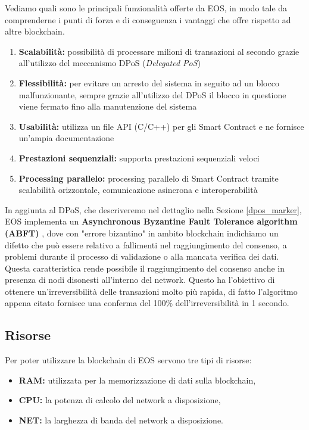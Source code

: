 Vediamo quali sono le principali funzionalità offerte da EOS, in modo tale da comprenderne i punti di forza e di conseguenza i vantaggi che offre rispetto ad altre blockchain.
\begin{enumerate}
    \item \textbf{Scalabilità:} possibilità di processare milioni di transazioni al secondo grazie all'utilizzo del meccanismo DPoS (\textit{Delegated PoS}) \cite{vitale2018DPOS,ZHANG202093}
    \item \textbf{Flessibilità:} per evitare un arresto del sistema in seguito ad un blocco malfunzionante, sempre grazie all'utilizzo del DPoS il blocco in questione viene fermato fino alla manutenzione del sistema
    \item \textbf{Usabilità:} utilizza un file API (C/C++) per gli Smart Contract e ne fornisce un'ampia documentazione
    \item \textbf{Prestazioni sequenziali:} supporta prestazioni sequenziali veloci
    \item \textbf{Processing parallelo:}  processing parallelo di Smart Contract tramite scalabilità orizzontale, comunicazione asincrona e interoperabilità
\end{enumerate}

In aggiunta al DPoS, che descriveremo nel dettaglio nella Sezione \ref{dpos_marker}, EOS implementa un \textbf{Asynchronous Byzantine Fault Tolerance algorithm (ABFT)} \cite{castro1999practical}, dove con "errore bizantino" in ambito blockchain indichiamo un difetto che può essere relativo a fallimenti nel raggiungimento del consenso, a problemi durante il processo di validazione o alla mancata verifica dei dati. 
\\
Questa caratteristica rende possibile il raggiungimento del consenso anche in presenza di nodi disonesti all'interno del network. Questo ha l'obiettivo di ottenere un'irreversibilità delle transazioni molto più rapida, di fatto l'algoritmo appena citato fornisce una conferma del 100\% dell'irreversibilità in 1 secondo.

\subsection{Risorse}
Per poter utilizzare la blockchain di EOS servono tre tipi di risorse:

\begin{itemize}
    \item \textbf{RAM:} utilizzata per la memorizzazione di dati sulla blockchain,
    \item \textbf{CPU:} la potenza di calcolo del network a disposizione,
    \item \textbf{NET:} la larghezza di banda del network a disposizione.
\end{itemize}

